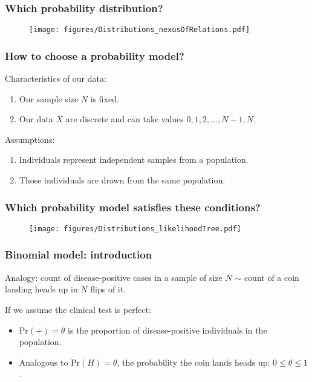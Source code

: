 \documentclass{beamer}
\begin{document}
\begin{frame}
	\frametitle{Which probability distribution?}
	
		\begin{figure}[h]
			\centerline{\texttt{[image: figures/Distributions\_nexusOfRelations.pdf]}}
		\end{figure}
	
\end{frame}


\begin{frame}
	\frametitle{How to choose a probability model?}
	
	Characteristics of our data:
	
	\begin{enumerate}
		\item Our sample size $N$ is fixed.
		\item Our data $X$ are discrete and can take values $0, 1, 2, ..., N-1, N$.
	\end{enumerate}
	
	Assumptions:
	
	\begin{enumerate}
		\item Individuals represent independent samples from a population.
		\item Those individuals are drawn from the same population.
	\end{enumerate}
	
\end{frame}

\begin{frame}
	\frametitle{Which probability model satisfies these conditions?}
	\begin{figure}[h]
		\centerline{\texttt{[image: figures/Distributions\_likelihoodTree.pdf]}}
	\end{figure}
	
\end{frame}

\begin{frame}
	\frametitle{Binomial model: introduction}
	
	Analogy: count of disease-positive cases in a sample of size $N$ $\sim$ count of a coin landing heads up in $N$ flips of it.
	
	\vspace{0.2cm}
	
	If we assume the clinical test is perfect:
	
	\begin{itemize}
		\item $\text{Pr}(+) = \theta$ is the proportion of disease-positive individuals in the population.
		\item Analogous to $\text{Pr}(H) = \theta$, the probability the coin lands heads up: $0\leq \theta \leq 1$.
	\end{itemize}
	
\end{frame}
\end{document}
